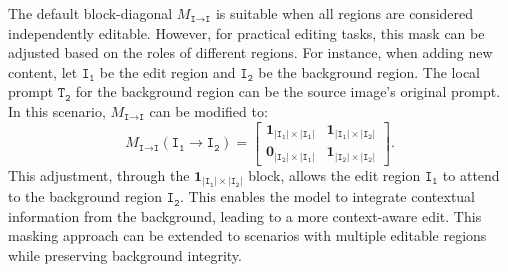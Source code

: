 \documentclass{article}
\begin{document}
The default block-diagonal $M_{\texttt{I}\to\texttt{I}}$ is suitable when all regions are considered independently editable. However, for practical editing tasks, this mask can be adjusted based on the roles of different regions. For instance, when adding new content, let $\texttt{I}_\texttt{1}$ be the edit region and $\texttt{I}_\texttt{2}$ be the background region. The local prompt $\texttt{T}_\texttt{2}$ for the background region can be the source image's original prompt. In this scenario, $M_{\texttt{I}\to\texttt{I}}$ can be modified to:
\begin{equation}
    M_{\texttt{I}\to\texttt{I}}(\texttt{I}_\texttt{1}\to\texttt{I}_\texttt{2})%
    =
    \begin{bmatrix}
        \mathbf{1}_{|\texttt{I}_\texttt{1}|\times|\texttt{I}_\texttt{1}|} &  \mathbf{1}_{|\texttt{I}_\texttt{1}|\times|\texttt{I}_\texttt{2}|}\\
        \mathbf{0}_{|\texttt{I}_\texttt{2}|\times|\texttt{I}_\texttt{1}|} &  \mathbf{1}_{|\texttt{I}_\texttt{2}|\times|\texttt{I}_\texttt{2}|}
    \end{bmatrix}.
    \label{eq:i2i_1}
\end{equation}
This adjustment, through the $\mathbf{1}_{|\texttt{I}_\texttt{1}|\times|\texttt{I}_\texttt{2}|}$ block, allows the edit region $\texttt{I}_\texttt{1}$ to attend to the background region $\texttt{I}_\texttt{2}$. This enables the model to integrate contextual information from the background, leading to a more context-aware edit. This masking approach can be extended to scenarios with multiple editable regions while preserving background integrity.
\end{document}
